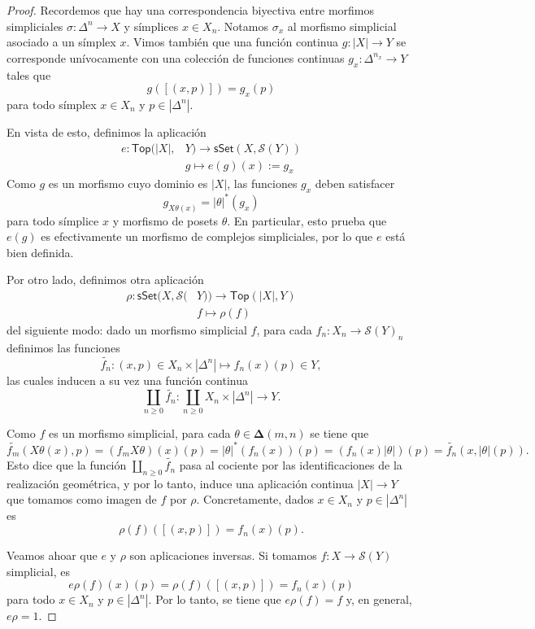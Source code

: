 \documentclass[11pt]{report}
\theoremstyle{colored}
\newcommand{\cat}[1]{\mathsf{#1}}
\renewcommand{\ss}[1]{\Delta^{#1}}
\newcommand{\ordcat}{\boldsymbol{\Delta}}
\begin{document}
\begin{proof} Recordemos que hay una correspondencia biyectiva entre morfimos simpliciales $\sigma: \ss{n} \to X$ y símplices $x \in X_n$. Notamos $\sigma_x$ al morfismo simplicial asociado a un símplex $x$. Vimos también que una función continua $g : |X| \to Y$ se corresponde unívocamente con una colección de funciones continuas $g_x : \ss{n_x} \to Y$ tales que 
\[
g([(x,p)]) = g_x(p)
\]
para todo símplex $x \in X_n$ y $p \in |\ss{n}|$. 

En vista de esto, definimos la aplicación
\begin{align*}
e : \cat{Top}(|X|,&Y) \to \cat{sSet}(X,\mathcal{S}(Y))\\
& g \longmapsto e(g)(x) := g_x
\end{align*}
Como $g$ es un morfismo cuyo dominio es $|X|$, las funciones $g_x$ deben satisfacer
\[
g_{X\theta(x)} = |\theta|^*(g_x)
\]
para todo símplice $x$ y morfismo de posets $\theta$. En particular, esto prueba que $e(g)$ es efectivamente un morfismo de complejos simpliciales, por lo que $e$ está bien definida.

Por otro lado, definimos otra aplicación
\begin{align*}
\rho : \cat{sSet}(X,\mathcal{S}(&Y)) \to \cat{Top}(|X|,Y)\\
& f \longmapsto \rho(f)
\end{align*}
del siguiente modo: dado un morfismo simplicial $f$, para cada $f_n : X_n \to \mathcal{S}(Y)_n$ definimos las funciones
\[
\widetilde{f_n} : (x,p) \in X_n \times |\ss{n}| \mapsto f_n(x)(p) \in Y,
\]
las cuales inducen a su vez una función continua
\[
\coprod_{n \geq 0} \widetilde{f_n} : \coprod_{n \geq 0} X_n \times |\ss{n}| \to Y.
\]

Como $f$ es un morfismo simplicial, para cada $\theta \in \ordcat(m,n)$ se tiene que
\[
\widetilde{f_m}(X\theta(x), p) = (f_mX\theta)(x)(p) = |\theta|^*(f_n(x))(p) = (f_n(x) |\theta|)(p) = \widetilde{f_n}(x,|\theta|(p)).
\]
Esto dice que la función $\coprod_{n \geq 0} \widetilde{f_n}$ pasa al cociente por las identificaciones de la realización geométrica, y por lo tanto, induce una aplicación continua $|X| \to Y$ que tomamos como imagen de $f$ por $\rho$. Concretamente, dados $x \in X_n$ y $p \in |\ss{n}|$ es
\[
\rho(f)([(x,p)]) = f_n(x)(p).
\]

Veamos ahoar que $e$ y $\rho$ son aplicaciones inversas. Si tomamos $f : X \to \mathcal{S}(Y)$ simplicial, es
\[
e\rho(f)(x)(p) = \rho(f)([(x,p)]) = f_n(x)(p)
\]
para todo $x \in X_n$ y $p \in |\ss{n}|$. Por lo tanto, se tiene que $e \rho(f) = f$ y, en general, $e \rho = 1$.


\end{proof}
\end{document}
